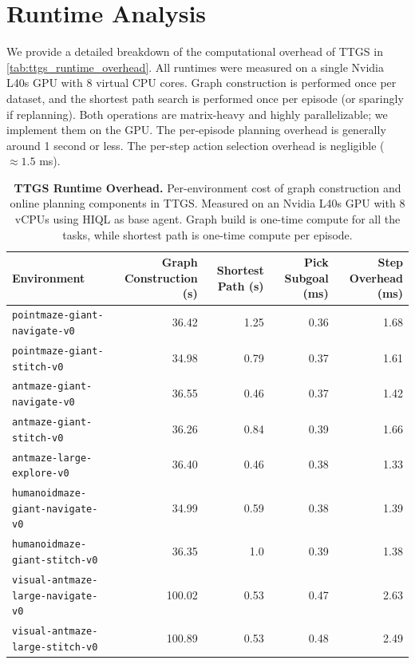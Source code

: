 \documentclass{article} %
\begin{document}
\section{Runtime Analysis} \label{apdx:runtime}

We provide a detailed breakdown of the computational overhead of TTGS in \autoref{tab:ttgs_runtime_overhead}. All runtimes were measured on a single Nvidia L40s GPU with 8 virtual CPU cores. Graph construction is performed once per dataset, and the shortest path search is performed once per episode (or sparingly if replanning). Both operations are matrix-heavy and highly parallelizable; we implement them on the GPU. The per-episode planning overhead is generally around 1 second or less. The per-step action selection overhead is negligible ($\approx 1.5$ ms).

\begin{table}[H]
    \centering
    \caption{\textbf{TTGS Runtime Overhead.} Per-environment cost of graph construction and online planning components in TTGS. Measured on an Nvidia L40s GPU with 8 vCPUs using HIQL as base agent. Graph build is one-time compute for all the tasks, while shortest path is one-time compute per episode. }
    \label{tab:ttgs_runtime_overhead}
    \scriptsize
    \setlength{\tabcolsep}{1.4pt}
    \renewcommand{\arraystretch}{1.5}
    \begin{tabular*}{\linewidth}{@{\extracolsep{\fill}} lrrrr}
    \toprule
    \textbf{Environment} & \textbf{Graph Construction (s)} & \textbf{Shortest Path (s)} & \textbf{Pick Subgoal (ms)} & \textbf{Step Overhead (ms)} \\
    \midrule
    \texttt{pointmaze-giant-navigate-v0} & 36.42 & 1.25 & 0.36 & 1.68 \\
    \texttt{pointmaze-giant-stitch-v0} & 34.98 & 0.79 & 0.37 & 1.61 \\
    \midrule
    \texttt{antmaze-giant-navigate-v0} & 36.55 & 0.46 & 0.37 & 1.42 \\
    \texttt{antmaze-giant-stitch-v0} & 36.26 & 0.84 & 0.39 & 1.66 \\
    \texttt{antmaze-large-explore-v0} & 36.40 & 0.46 & 0.38 & 1.33 \\
    \midrule
    \texttt{humanoidmaze-giant-navigate-v0} & 34.99 & 0.59 & 0.38 & 1.39 \\
    \texttt{humanoidmaze-giant-stitch-v0} & 36.35 & 1.0 & 0.39 & 1.38 \\
    \midrule
    \texttt{visual-antmaze-large-navigate-v0} & 100.02 & 0.53 & 0.47 & 2.63 \\
    \texttt{visual-antmaze-large-stitch-v0} & 100.89 & 0.53 & 0.48 & 2.49 \\
    \bottomrule
    \end{tabular*}
\end{table}
\end{document}
